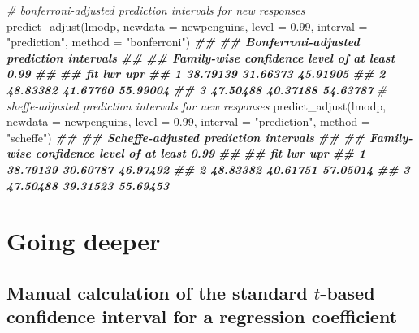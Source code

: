 \documentclass[
]{book}
\newenvironment{Shaded}{\begin{snugshade}}{\end{snugshade}}
\newcommand{\AttributeTok}[1]{\textcolor[rgb]{0.77,0.63,0.00}{#1}}
\newcommand{\CommentTok}[1]{\textcolor[rgb]{0.56,0.35,0.01}{\textit{#1}}}
\newcommand{\DocumentationTok}[1]{\textcolor[rgb]{0.56,0.35,0.01}{\textbf{\textit{#1}}}}
\newcommand{\FloatTok}[1]{\textcolor[rgb]{0.00,0.00,0.81}{#1}}
\newcommand{\FunctionTok}[1]{\textcolor[rgb]{0.00,0.00,0.00}{#1}}
\newcommand{\NormalTok}[1]{#1}
\newcommand{\StringTok}[1]{\textcolor[rgb]{0.31,0.60,0.02}{#1}}
\theoremstyle{definition}
\theoremstyle{definition}
\theoremstyle{definition}
\theoremstyle{definition}
\theoremstyle{remark}
\begin{document}
\begin{Shaded}
\begin{Highlighting}[]
\CommentTok{\# bonferroni{-}adjusted prediction intervals for new responses}
\FunctionTok{predict\_adjust}\NormalTok{(lmodp, }\AttributeTok{newdata =}\NormalTok{ newpenguins, }\AttributeTok{level =} \FloatTok{0.99}\NormalTok{,}
               \AttributeTok{interval =} \StringTok{"prediction"}\NormalTok{,}
               \AttributeTok{method =} \StringTok{"bonferroni"}\NormalTok{)}
\DocumentationTok{\#\# }
\DocumentationTok{\#\# Bonferroni{-}adjusted prediction intervals}
\DocumentationTok{\#\# }
\DocumentationTok{\#\# Family{-}wise confidence level of at least 0.99 }
\DocumentationTok{\#\# }
\DocumentationTok{\#\#        fit      lwr      upr}
\DocumentationTok{\#\# 1 38.79139 31.66373 45.91905}
\DocumentationTok{\#\# 2 48.83382 41.67760 55.99004}
\DocumentationTok{\#\# 3 47.50488 40.37188 54.63787}
\CommentTok{\# sheffe{-}adjusted prediction intervals for new responses}
\FunctionTok{predict\_adjust}\NormalTok{(lmodp, }\AttributeTok{newdata =}\NormalTok{ newpenguins, }\AttributeTok{level =} \FloatTok{0.99}\NormalTok{,}
               \AttributeTok{interval =} \StringTok{"prediction"}\NormalTok{,}
               \AttributeTok{method =} \StringTok{"scheffe"}\NormalTok{)}
\DocumentationTok{\#\# }
\DocumentationTok{\#\# Scheffe{-}adjusted prediction intervals}
\DocumentationTok{\#\# }
\DocumentationTok{\#\# Family{-}wise confidence level of at least 0.99 }
\DocumentationTok{\#\# }
\DocumentationTok{\#\#        fit      lwr      upr}
\DocumentationTok{\#\# 1 38.79139 30.60787 46.97492}
\DocumentationTok{\#\# 2 48.83382 40.61751 57.05014}
\DocumentationTok{\#\# 3 47.50488 39.31523 55.69453}
\end{Highlighting}
\end{Shaded}

\hypertarget{going-deeper-2}{%
\section{Going deeper}\label{going-deeper-2}}

\hypertarget{manual-t-cis}{%
\subsection{\texorpdfstring{Manual calculation of the standard \(t\)-based confidence interval for a regression coefficient}{Manual calculation of the standard t-based confidence interval for a regression coefficient}}\label{manual-t-cis}}
\end{document}
